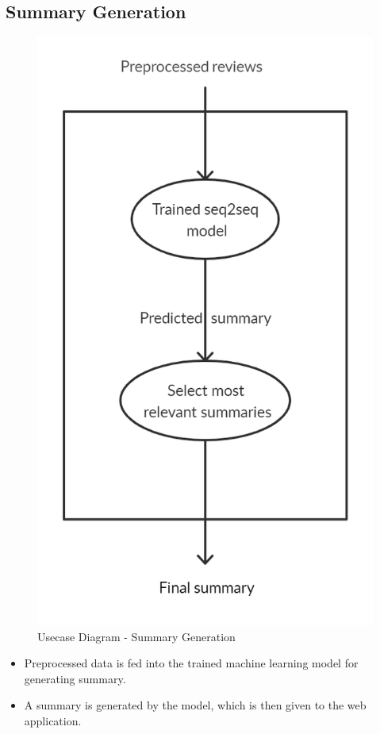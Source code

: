 \documentclass[11pt]{report}
\begin{document}
\subsection{Summary Generation}
\begin{figure}[h]
\centering
\includegraphics[scale=0.5]{images/summary_usecase.png}
\caption{Usecase Diagram - Summary Generation}
\label{fig:usecase5}
\end{figure}

\begin{itemize}
\item Preprocessed data is fed into the trained machine learning model for generating summary.
\item A summary is generated by the model, which is then given to the web application.
\end{itemize}
\end{document}
